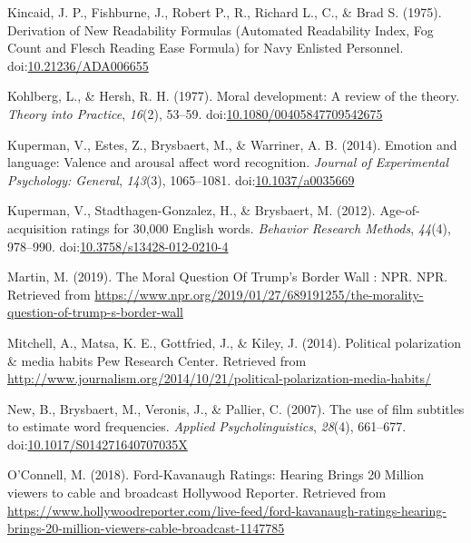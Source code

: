 \documentclass[english,,man]{apa6}
\begin{document}
\leavevmode\hypertarget{ref-Kincaid1975}{}%
Kincaid, J. P., Fishburne, J., Robert P., R., Richard L., C., \& Brad S. (1975). Derivation of New Readability Formulas (Automated Readability Index, Fog Count and Flesch Reading Ease Formula) for Navy Enlisted Personnel. doi:\href{https://doi.org/10.21236/ADA006655}{10.21236/ADA006655}

\leavevmode\hypertarget{ref-Kohlberg1977}{}%
Kohlberg, L., \& Hersh, R. H. (1977). Moral development: A review of the theory. \emph{Theory into Practice}, \emph{16}(2), 53--59. doi:\href{https://doi.org/10.1080/00405847709542675}{10.1080/00405847709542675}

\leavevmode\hypertarget{ref-Kuperman2014}{}%
Kuperman, V., Estes, Z., Brysbaert, M., \& Warriner, A. B. (2014). Emotion and language: Valence and arousal affect word recognition. \emph{Journal of Experimental Psychology: General}, \emph{143}(3), 1065--1081. doi:\href{https://doi.org/10.1037/a0035669}{10.1037/a0035669}

\leavevmode\hypertarget{ref-Kuperman2012}{}%
Kuperman, V., Stadthagen-Gonzalez, H., \& Brysbaert, M. (2012). Age-of-acquisition ratings for 30,000 English words. \emph{Behavior Research Methods}, \emph{44}(4), 978--990. doi:\href{https://doi.org/10.3758/s13428-012-0210-4}{10.3758/s13428-012-0210-4}

\leavevmode\hypertarget{ref-Martin2019}{}%
Martin, M. (2019). The Moral Question Of Trump's Border Wall : NPR. NPR. Retrieved from \url{https://www.npr.org/2019/01/27/689191255/the-morality-question-of-trump-s-border-wall}

\leavevmode\hypertarget{ref-Mitchell2014}{}%
Mitchell, A., Matsa, K. E., Gottfried, J., \& Kiley, J. (2014). Political polarization \& media habits \textbar{} Pew Research Center. Retrieved from \url{http://www.journalism.org/2014/10/21/political-polarization-media-habits/}

\leavevmode\hypertarget{ref-New2007}{}%
New, B., Brysbaert, M., Veronis, J., \& Pallier, C. (2007). The use of film subtitles to estimate word frequencies. \emph{Applied Psycholinguistics}, \emph{28}(4), 661--677. doi:\href{https://doi.org/10.1017/S014271640707035X}{10.1017/S014271640707035X}

\leavevmode\hypertarget{ref-OConnell2018}{}%
O'Connell, M. (2018). Ford-Kavanaugh Ratings: Hearing Brings 20 Million viewers to cable and broadcast \textbar{} Hollywood Reporter. Retrieved from \url{https://www.hollywoodreporter.com/live-feed/ford-kavanaugh-ratings-hearing-brings-20-million-viewers-cable-broadcast-1147785}
\end{document}
